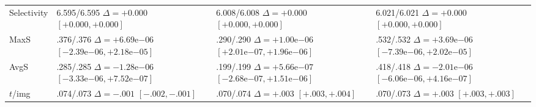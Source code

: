 \begin{tabularx}{\linewidth}{>{\raggedright\arraybackslash}p{1.8cm}*{3}{>{\raggedright\arraybackslash}X}}
Selectivity & \shortstack[l]{6.595/6.595\\$\Delta=+0.000$\\$[+0.000,+0.000]$} & \shortstack[l]{6.008/6.008\\$\Delta=+0.000$\\$[+0.000,+0.000]$} & \shortstack[l]{6.021/6.021\\$\Delta=+0.000$\\$[+0.000,+0.000]$} \\
MaxS & \shortstack[l]{.376/.376\\$\Delta=+6.69\mathrm{e}{-06}$\\$[-2.39\mathrm{e}{-06},+2.18\mathrm{e}{-05}]$} & \shortstack[l]{.290/.290\\$\Delta=+1.00\mathrm{e}{-06}$\\$[+2.01\mathrm{e}{-07},+1.96\mathrm{e}{-06}]$} & \shortstack[l]{.532/.532\\$\Delta=+3.69\mathrm{e}{-06}$\\$[-7.39\mathrm{e}{-06},+2.02\mathrm{e}{-05}]$} \\
AvgS & \shortstack[l]{.285/.285\\$\Delta=-1.28\mathrm{e}{-06}$\\$[-3.33\mathrm{e}{-06},+7.52\mathrm{e}{-07}]$} & \shortstack[l]{.199/.199\\$\Delta=+5.66\mathrm{e}{-07}$\\$[-2.68\mathrm{e}{-07},+1.51\mathrm{e}{-06}]$} & \shortstack[l]{.418/.418\\$\Delta=-2.01\mathrm{e}{-06}$\\$[-6.06\mathrm{e}{-06},+4.16\mathrm{e}{-07}]$} \\
$t$/img & \shortstack[l]{.074/.073\\$\Delta=-.001$\\$[-.002,-.001]$} & \shortstack[l]{.070/.074\\$\Delta=+.003$\\$[+.003,+.004]$} & \shortstack[l]{.070/.073\\$\Delta=+.003$\\$[+.003,+.003]$} \\
\bottomrule
\end{tabularx}
